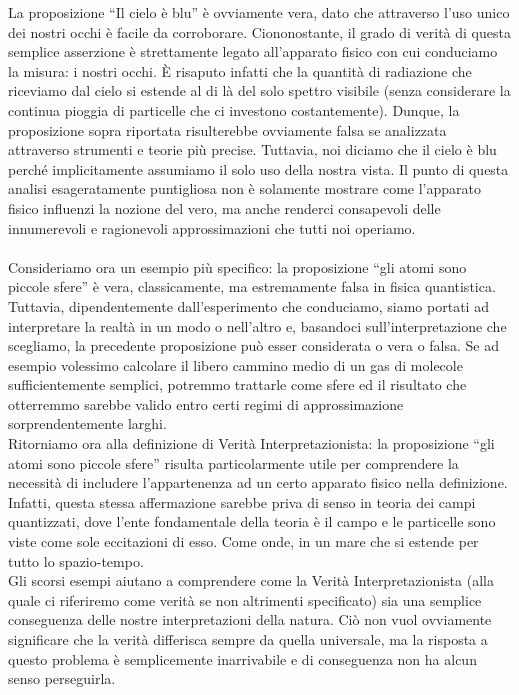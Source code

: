 \documentclass[]{article}
\begin{document}
	La proposizione \enquote{Il cielo è blu} è ovviamente vera, dato che attraverso l'uso unico dei nostri occhi è facile da corroborare. Ciononostante, il grado di verità di questa semplice asserzione è strettamente legato all'apparato fisico con cui conduciamo la misura: i nostri occhi. \`E risaputo infatti che la quantità di radiazione che riceviamo dal cielo si estende al di là del solo spettro visibile (senza considerare la continua pioggia di particelle che ci investono costantemente). Dunque, la proposizione sopra riportata risulterebbe ovviamente falsa se analizzata attraverso strumenti e teorie più precise. Tuttavia, noi diciamo che il cielo è blu perché implicitamente assumiamo il solo uso della nostra vista. Il punto di questa analisi esageratamente puntigliosa non è solamente mostrare come l'apparato fisico influenzi la nozione del vero, ma anche renderci consapevoli delle innumerevoli e ragionevoli approssimazioni che tutti noi operiamo.\\
	\\
	Consideriamo ora un esempio più specifico: la proposizione \enquote{gli atomi sono piccole sfere} è vera, classicamente, ma estremamente falsa in fisica quantistica. Tuttavia, dipendentemente dall'esperimento che conduciamo, siamo portati ad interpretare la realtà in un modo o nell'altro e, basandoci sull'interpretazione che scegliamo, la precedente proposizione può esser considerata o vera o falsa. Se ad esempio volessimo calcolare il libero cammino medio di un gas di molecole sufficientemente semplici, potremmo trattarle come sfere ed il risultato che otterremmo sarebbe valido entro certi regimi di approssimazione sorprendentemente larghi.\\
	Ritorniamo ora alla definizione di Verità Interpretazionista: la proposizione \enquote{gli atomi sono piccole sfere} risulta particolarmente utile per comprendere la necessità di includere l'appartenenza ad un certo apparato fisico nella definizione. Infatti, questa stessa affermazione sarebbe priva di senso in teoria dei campi quantizzati, dove l'ente fondamentale della teoria è il campo e le particelle sono viste come sole eccitazioni di esso. Come onde, in un mare che si estende per tutto lo spazio-tempo.\\
	Gli scorsi esempi aiutano a comprendere come la Verità Interpretazionista (alla quale ci riferiremo come verità se non altrimenti specificato) sia una semplice conseguenza delle nostre interpretazioni della natura. Ciò non vuol ovviamente significare che la verità differisca sempre da quella universale, ma la risposta a questo problema è semplicemente inarrivabile e di conseguenza non ha alcun senso perseguirla.\\
\end{document}

